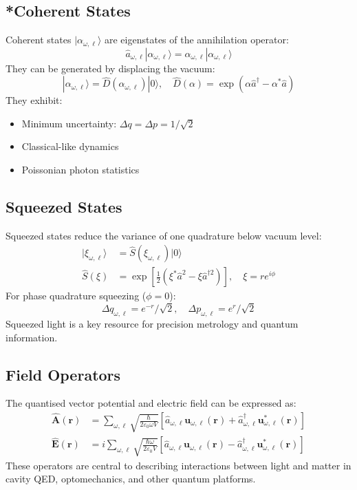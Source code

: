 \subsection{*Coherent States}

Coherent states $|\alpha_{\omega,\ell}\rangle$ are eigenstates of the annihilation operator:
\begin{equation}
\hat{a}_{\omega,\ell}|\alpha_{\omega,\ell}\rangle = \alpha_{\omega,\ell}|\alpha_{\omega,\ell}\rangle
\end{equation}
They can be generated by displacing the vacuum:
\begin{equation}
|\alpha_{\omega,\ell}\rangle = \hat{D}(\alpha_{\omega,\ell})|0\rangle, \quad \hat{D}(\alpha) = \exp(\alpha \hat{a}^\dagger - \alpha^* \hat{a})
\end{equation}
They exhibit:
\begin{itemize}
  \item Minimum uncertainty: $\Delta q = \Delta p = 1/\sqrt{2}$
  \item Classical-like dynamics
  \item Poissonian photon statistics
\end{itemize}

\subsection{Squeezed States}

Squeezed states reduce the variance of one quadrature below vacuum level:
\begin{align}
|\xi_{\omega,\ell}\rangle &= \hat{S}(\xi_{\omega,\ell}) |0\rangle \\
\hat{S}(\xi) &= \exp\left[\frac{1}{2}(\xi^* \hat{a}^2 - \xi \hat{a}^{\dagger 2})\right], \quad \xi = r e^{i\phi}
\end{align}
For phase quadrature squeezing ($\phi = 0$):
\begin{equation}
\Delta q_{\omega,\ell} = e^{-r}/\sqrt{2}, \quad \Delta p_{\omega,\ell} = e^{r}/\sqrt{2}
\end{equation}
Squeezed light is a key resource for precision metrology and quantum information.

\subsection{Field Operators}

The quantised vector potential and electric field can be expressed as:
\begin{align}
\hat{\mathbf{A}}(\mathbf{r}) &= \sum_{\omega,\ell} \sqrt{\frac{\hbar}{2\varepsilon_0 \omega V}} \left[ \hat{a}_{\omega,\ell} \mathbf{u}_{\omega,\ell}(\mathbf{r}) + \hat{a}_{\omega,\ell}^\dagger \mathbf{u}_{\omega,\ell}^*(\mathbf{r}) \right] \\
\hat{\mathbf{E}}(\mathbf{r}) &= i \sum_{\omega,\ell} \sqrt{\frac{\hbar \omega}{2\varepsilon_0 V}} \left[ \hat{a}_{\omega,\ell} \mathbf{u}_{\omega,\ell}(\mathbf{r}) - \hat{a}_{\omega,\ell}^\dagger \mathbf{u}_{\omega,\ell}^*(\mathbf{r}) \right]
\end{align}
These operators are central to describing interactions between light and matter in cavity QED, optomechanics, and other quantum platforms.

